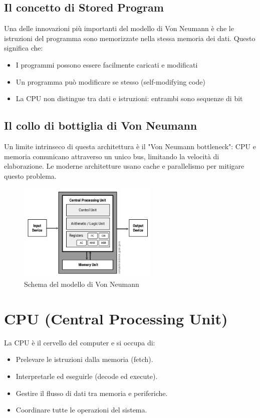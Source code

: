 \documentclass[12pt,a4paper]{article}
\begin{document}
\subsection{Il concetto di Stored Program}
Una delle innovazioni più importanti del modello di Von Neumann è che le istruzioni del programma sono memorizzate nella stessa memoria dei dati. Questo significa che:
\begin{itemize}
    \item I programmi possono essere facilmente caricati e modificati
    \item Un programma può modificare se stesso (self-modifying code)
    \item La CPU non distingue tra dati e istruzioni: entrambi sono sequenze di bit
\end{itemize}

\subsection{Il collo di bottiglia di Von Neumann}
Un limite intrinseco di questa architettura è il "Von Neumann bottleneck": CPU e memoria comunicano attraverso un unico bus, limitando la velocità di elaborazione. Le moderne architetture usano cache e parallelismo per mitigare questo problema.

\begin{figure}[h]
    \centering
    \includegraphics[width=0.6\textwidth]{images/Von-Neumann-Architecture-Diagram.jpg}
    \caption{Schema del modello di Von Neumann}
\end{figure}

\section{CPU (Central Processing Unit)}
La CPU è il cervello del computer e si occupa di:
\begin{itemize}
    \item Prelevare le istruzioni dalla memoria (fetch).
    \item Interpretarle ed eseguirle (decode ed execute).
    \item Gestire il flusso di dati tra memoria e periferiche.
    \item Coordinare tutte le operazioni del sistema.
\end{itemize}
\end{document}
